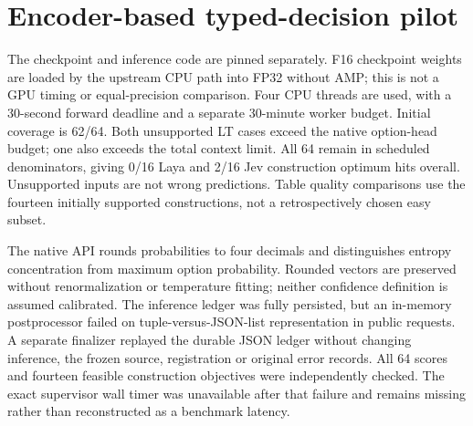 \documentclass[11pt]{article}
\begin{document}
\section{Encoder-based typed-decision pilot}
\label{app:laya}
The checkpoint and inference code are pinned separately. F16 checkpoint
weights are loaded by the upstream CPU path into FP32 without AMP; this is
not a GPU timing or equal-precision comparison. Four CPU threads are used,
with a 30-second forward deadline and a separate 30-minute worker budget.
Initial coverage is 62/64. Both unsupported LT cases exceed the native
option-head budget; one also exceeds the total context limit.
All 64 remain in scheduled denominators, giving 0/16 Laya and 2/16 Jev
construction optimum hits overall. Unsupported inputs are not wrong
predictions. Table quality comparisons use the fourteen initially supported
constructions, not a retrospectively chosen easy subset.

\begin{table}[ht]
\centering\small

\caption{Laya CPU exact-task results on the exploratory panel. All eight
instances per task fit losslessly. Historical Jev is independently replayed;
these small differences are not a population ranking.}
\end{table}
\begin{table}[ht]
\centering\small
\resizebox{\textwidth}{!}{}
\caption{Initial Laya coverage out of four scheduled constructions per task,
followed by optimum hits and mean additive gaps on exactly that supported
subset for both methods. LT quality uses only the two $n=8$ instances.
Lower gaps are better, but their units differ across tasks.}
\end{table}

The native API rounds probabilities to four decimals and distinguishes
entropy concentration from maximum option probability. Rounded vectors
are preserved without renormalization or temperature fitting; neither
confidence definition is assumed calibrated.
The inference ledger was fully persisted, but an in-memory postprocessor
failed on tuple-versus-JSON-list representation in public requests.
A separate finalizer replayed the durable JSON ledger without changing
inference, the frozen source, registration or original error records.
All 64 scores and fourteen feasible construction objectives were
independently checked. The exact supervisor wall timer was unavailable
after that failure and remains missing rather than reconstructed as a
benchmark latency.
\end{document}
